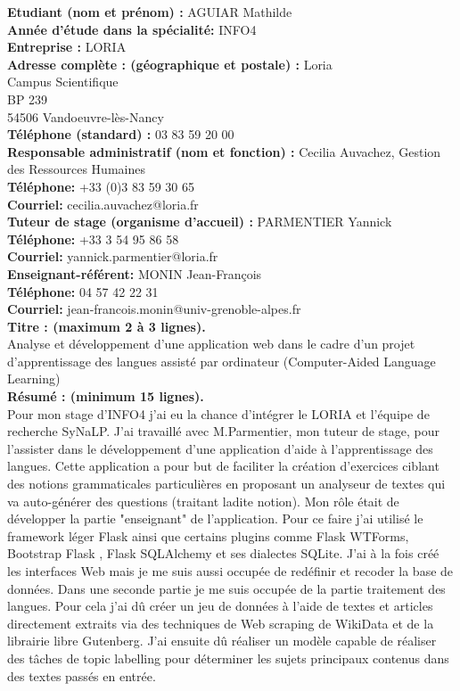 

\textbf{Etudiant (nom et prénom) :} AGUIAR Mathilde \\
\textbf{Année d’étude dans la spécialité:} INFO4 \\

\textbf{Entreprise :} LORIA \\
\textbf{Adresse complète : (géographique et postale) :} Loria \\
Campus Scientifique \\
BP 239 \\
54506 Vandoeuvre-lès-Nancy \\
\textbf{Téléphone (standard) :} 03 83 59 20 00 \\

\textbf{Responsable administratif (nom et fonction) :} Cecilia Auvachez, Gestion des Ressources Humaines \\
\textbf{Téléphone:} +33 (0)3 83 59 30 65 \\
\textbf{Courriel:} cecilia.auvachez@loria.fr \\

\textbf{Tuteur de stage (organisme d’accueil) :} PARMENTIER Yannick\\
\textbf{Téléphone:} +33 3 54 95 86 58 \\
\textbf{Courriel:} yannick.parmentier@loria.fr \\

\textbf{Enseignant-référent:} MONIN Jean-François \\
\textbf{Téléphone:} 04 57 42 22 31 \\
\textbf{Courriel:} jean-francois.monin@univ-grenoble-alpes.fr \\

\textbf{Titre : (maximum 2 à 3 lignes).} \\
Analyse et développement d’une application web dans le cadre d’un projet
d’apprentissage des langues assisté par ordinateur (Computer-Aided Language
Learning) \\
\textbf{Résumé : (minimum 15 lignes).}\\
Pour mon stage d’INFO4 j’ai eu la chance d’intégrer le LORIA et l’équipe de recherche SyNaLP. J’ai travaillé avec M.Parmentier, mon tuteur de stage, pour l’assister dans le développement d’une application d’aide à l’apprentissage des langues. Cette application a pour but de faciliter la création d’exercices ciblant des notions grammaticales particulières en proposant un analyseur de textes qui va auto-générer des questions (traitant ladite notion). 
Mon rôle était de développer la partie "enseignant" de l’application. Pour ce faire j’ai utilisé le framework léger Flask ainsi que certains plugins comme Flask WTForms, Bootstrap Flask , Flask SQLAlchemy et ses dialectes SQLite. J’ai à la fois créé les interfaces Web mais je me suis aussi occupée de redéfinir et recoder la base de données. 
Dans une seconde partie je me suis occupée de la partie traitement des langues. Pour cela j'ai dû créer un jeu de données à l'aide de textes et articles directement extraits via des techniques de Web scraping de WikiData et de la librairie libre Gutenberg. J'ai ensuite dû réaliser un modèle capable de réaliser des tâches de topic labelling pour déterminer les sujets principaux contenus dans des textes passés en entrée. 


